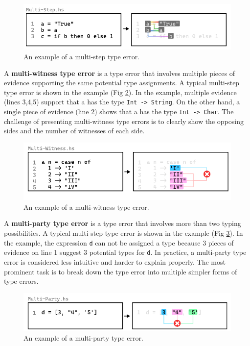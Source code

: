 \begin{figure}[hbt]
  \includegraphics[width=\linewidth]{Multi-Step}
  \caption{
    \label{fig:multi-step-example}
    An example of a multi-step type error.
    }
\end{figure}

A \textbf{multi-witness type error} is a type error that involves multiple pieces of evidence supporting the same potential type assignments.  A typical multi-step type error is shown in the example (Fig \ref{fig:multi-witness-example}). In the example, multiple evidence (lines 3,4,5) support that a has the type \texttt{Int -> String}. On the other hand, a single piece of evidence (line 2) shows that a has the type \texttt{Int -> Char}. The challenge of presenting multi-witness type errors is to clearly show the opposing sides and the number of witnesses of each side. 

\begin{figure}[hbt]
  \includegraphics[width=\linewidth]{Multi-Witness}
  \caption{
    \label{fig:multi-witness-example}
    An example of a multi-witness type error.
    }
\end{figure}

A \textbf{multi-party type error} is a type error that involves more than two typing possibilities.  A typical multi-step type error is shown in the example (Fig \ref{fig:multi-party-example}). In the example, the expression \texttt{d} can not be assigned a type because 3 pieces of evidence on line 1 suggest 3 potential types for \texttt{d}. In practice, a multi-party type error is considered less intuitive and harder to explain properly. The most prominent task is to break down the type error into multiple simpler forms of type errors. 



\begin{figure}[hbt]
  \includegraphics[width=\linewidth]{Multi-Party}
  \caption{
    \label{fig:multi-party-example}
    An example of a multi-party type error.
    }
\end{figure}

